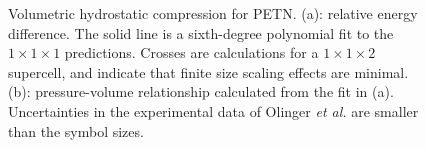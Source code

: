 \documentclass[prb,aps,nobibnotes,twocolumn,doublespace,twocolumngrid,superbib]{revtex4}
\begin{document}
\begin{figure}
\caption{Volumetric hydrostatic compression for PETN.
(a): relative energy difference. The
solid line is a sixth-degree polynomial fit to the $1\times 1\times 1$ 
predictions.
Crosses are calculations for a $1\times 1\times 2$ supercell, and indicate
that finite size scaling effects are minimal.  (b): pressure-volume 
relationship calculated from the fit in (a).  Uncertainties in the 
experimental data of Olinger {\it et al.}\cite{Olinger_1975v62}  are smaller than the symbol 
sizes.
}
\label{fig:volume_compress}
\end{figure}
\end{document}
